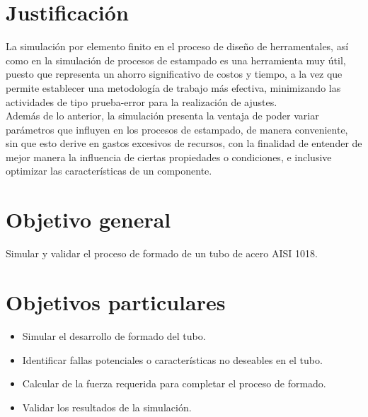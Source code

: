 \section{Justificación}

La simulación por elemento finito en el proceso de diseño de herramentales, así como en 
la simulación de procesos de estampado es una herramienta muy útil, puesto que representa un ahorro 
significativo de costos y tiempo, a la vez que permite establecer una metodología de trabajo más efectiva, minimizando las 
actividades de tipo prueba-error para la realización de ajustes.\\

Además de lo anterior, la simulación presenta la ventaja de poder variar parámetros que influyen en los procesos de 
estampado, de manera conveniente, sin que esto derive en gastos excesivos de recursos, con la finalidad de entender 
de mejor manera la influencia de ciertas propiedades o condiciones, e inclusive optimizar las características 
de un componente.





\section{Objetivo general}

Simular y validar el proceso de formado de un tubo de acero AISI 1018.

\section{Objetivos particulares}
\begin{itemize}
\item Simular el desarrollo de formado del tubo.
\item Identificar fallas potenciales o características no deseables en el tubo.
\item Calcular de la fuerza requerida para completar el proceso de formado.
\item Validar los resultados de la simulación.
\end{itemize}


